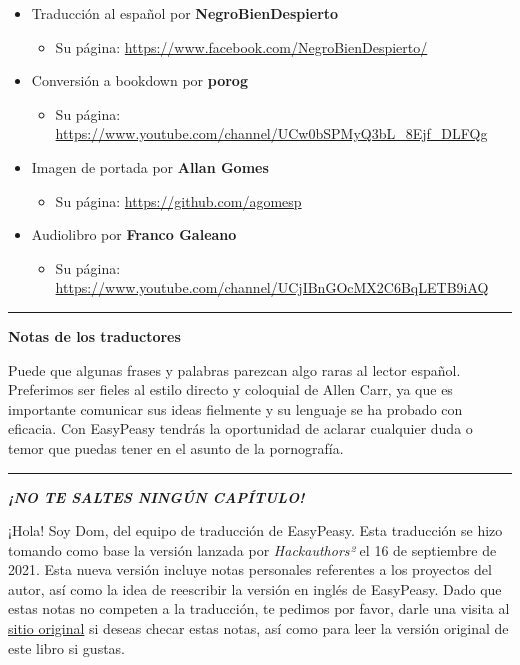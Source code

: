 \documentclass[
  spanish,
  openany]{book}
\providecommand{\tightlist}{%
  \setlength{\itemsep}{0pt}\setlength{\parskip}{0pt}}
\let\oldurl\url
\renewcommand\url{\renewcommand\UrlFont{\ttfamily\color{linkcolor}}\oldurl}
\let\oldhref\href
\renewcommand{\href}[2]{\textcolor{linkcolor}{\oldhref{#1}{#2}}}
\begin{document}
\begin{itemize}
\tightlist
\item
  Traducción al español por \textbf{NegroBienDespierto}

  \begin{itemize}
  \tightlist
  \item
    Su página: \url{https://www.facebook.com/NegroBienDespierto/}
  \end{itemize}
\item
  Conversión a bookdown por \textbf{porog}

  \begin{itemize}
  \tightlist
  \item
    Su página: \url{https://www.youtube.com/channel/UCw0bSPMyQ3bL_8Ejf_DLFQg}
  \end{itemize}
\item
  Imagen de portada por \textbf{Allan Gomes}

  \begin{itemize}
  \tightlist
  \item
    Su página: \url{https://github.com/agomesp}
  \end{itemize}
\item
  Audiolibro por \textbf{Franco Galeano}

  \begin{itemize}
  \tightlist
  \item
    Su página: \url{https://www.youtube.com/channel/UCjIBnGOcMX2C6BqLETB9iAQ}
  \end{itemize}
\end{itemize}

\begin{center}\rule{0.5\linewidth}{0.5pt}\end{center}

\textbf{Notas de los traductores}

Puede que algunas frases y palabras parezcan algo raras al lector español. Preferimos ser fieles al estilo directo y coloquial de Allen Carr, ya que es importante comunicar sus ideas fielmente y su lenguaje se ha probado con eficacia. Con EasyPeasy tendrás la oportunidad de aclarar cualquier duda o temor que puedas tener en el asunto de la pornografía.

\begin{center}\rule{0.5\linewidth}{0.5pt}\end{center}

{\emph{\textbf{¡NO TE SALTES NINGÚN CAPÍTULO!}}}

¡Hola! Soy Dom, del equipo de traducción de EasyPeasy. Esta traducción se hizo tomando como base la versión lanzada por \emph{Hackauthors²} el 16 de septiembre de 2021. Esta nueva versión incluye notas personales referentes a los proyectos del autor, así como la idea de reescribir la versión en inglés de EasyPeasy. Dado que estas notas no competen a la traducción, te pedimos por favor, darle una visita al \href{https://easypeasymethod.org/}{sitio original} si deseas checar estas notas, así como para leer la versión original de este libro si gustas.
\end{document}
